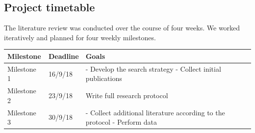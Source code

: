 \documentclass[]{book}
\begin{document}
\subsection{Project timetable}\label{project-timetable}

The literature review was conducted over the course of four weeks. We
worked iteratively and planned for four weekly milestones.

\begin{longtable}[]{@{}lll@{}}
\toprule
\begin{minipage}[b]{0.22\columnwidth}\raggedright\strut
Milestone\strut
\end{minipage} & \begin{minipage}[b]{0.18\columnwidth}\raggedright\strut
Deadline\strut
\end{minipage} & \begin{minipage}[b]{0.48\columnwidth}\raggedright\strut
Goals\strut
\end{minipage}\tabularnewline
\midrule
\endhead
\begin{minipage}[t]{0.22\columnwidth}\raggedright\strut
Milestone 1\strut
\end{minipage} & \begin{minipage}[t]{0.18\columnwidth}\raggedright\strut
16/9/18\strut
\end{minipage} & \begin{minipage}[t]{0.48\columnwidth}\raggedright\strut
- Develop the search strategy - Collect initial publications\strut
\end{minipage}\tabularnewline
\begin{minipage}[t]{0.22\columnwidth}\raggedright\strut
Milestone 2\strut
\end{minipage} & \begin{minipage}[t]{0.18\columnwidth}\raggedright\strut
23/9/18\strut
\end{minipage} & \begin{minipage}[t]{0.48\columnwidth}\raggedright\strut
Write full research protocol\strut
\end{minipage}\tabularnewline
\begin{minipage}[t]{0.22\columnwidth}\raggedright\strut
Milestone 3\strut
\end{minipage} & \begin{minipage}[t]{0.18\columnwidth}\raggedright\strut
30/9/18\strut
\end{minipage} & \begin{minipage}[t]{0.48\columnwidth}\raggedright\strut
- Collect additional literature according to the protocol - Perform data

\end{minipage}
\end{longtable}
\end{document}
